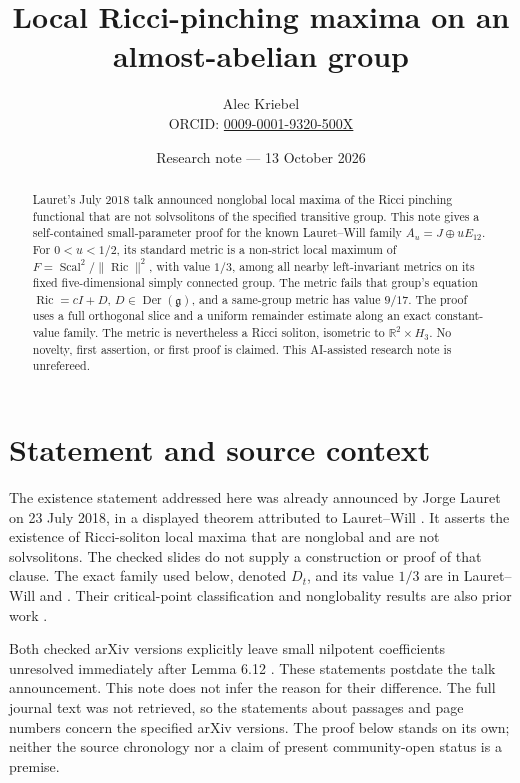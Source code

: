 \documentclass[11pt]{article}
\title{Local Ricci-pinching maxima on an almost-abelian group}
\author{Alec Kriebel\\
\small ORCID: \href{https://orcid.org/0009-0001-9320-500X}{0009-0001-9320-500X}}
\date{Research note --- 13 October 2026}
\newcommand{\R}{\mathbb R}
\newcommand{\Ric}{\operatorname{Ric}}
\newcommand{\Scal}{\operatorname{Scal}}
\newcommand{\Der}{\operatorname{Der}}
\newcommand{\norm}[1]{\lVert #1\rVert}
\begin{document}
\maketitle
\begin{abstract}
Lauret's July 2018 talk announced nonglobal local maxima of the Ricci
pinching functional that are not solvsolitons of the specified transitive
group. This note gives a self-contained small-parameter proof for the
known Lauret--Will family \(A_u=J\oplus uE_{12}\).
For \(0<u<1/2\), its standard metric is a non-strict local maximum of
\(F=\Scal^2/\norm{\Ric}^2\), with value \(1/3\), among all nearby
left-invariant metrics on its fixed five-dimensional simply connected
group. The metric fails that group's equation \(\Ric=cI+D\),
\(D\in\Der(\mathfrak g)\), and a same-group metric has value \(9/17\).
The proof uses a full orthogonal slice and a uniform remainder estimate
along an exact constant-value family. The metric is nevertheless a Ricci
soliton, isometric to \(\R^2\times H_3\). No novelty, first assertion, or
first proof is claimed. This AI-assisted research note is unrefereed.
\end{abstract}

\section{Statement and source context}

The existence statement addressed here was already announced by Jorge
Lauret on 23 July 2018, in a displayed theorem attributed to
Lauret--Will \cite[slide 13/17, overlay PDF pp.~71--73]{talk}.
It asserts the existence of Ricci-soliton local maxima that are
nonglobal and are not solvsolitons. The checked slides do not supply a
construction or proof of that clause.
The exact family used below, denoted \(D_t\), and its value \(1/3\)
are in Lauret--Will \cite[\S6.4, p.~19]{LWv1} and
\cite[\S6.4, p.~20]{LWv2}. Their critical-point classification and
nonglobality results are also prior work
\cite[Theorem 1.5, Theorem 6.5(iii), Proposition 6.11]{LWv2}.

Both checked arXiv versions explicitly leave small nilpotent
coefficients unresolved immediately after Lemma 6.12
\cite[pp.~18--19]{LWv1}\cite[p.~19]{LWv2}.
These statements postdate the talk announcement. This note does not
infer the reason for their difference. The full journal text was not
retrieved, so the statements about passages and page numbers concern
the specified arXiv versions. The proof below stands on its own;
neither the source chronology nor a claim of present community-open
status is a premise.
\end{document}
